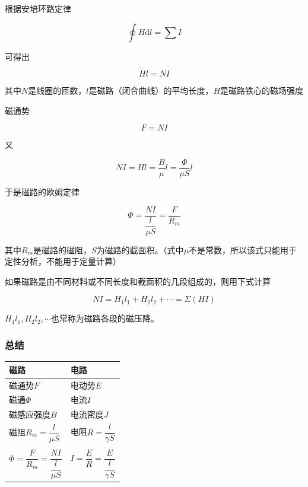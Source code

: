 \documentclass[12pt]{article}
\newcommand{\rmd}{\mathrm{d}}
\begin{document}
根据安培环路定律

\begin{equation}
    \oint H \rmd l = \sum I
\end{equation}

可得出

\begin{equation}
    H l = N I
\end{equation}

其中\(N\)是线圈的匝数，\(l\)是磁路（闭合曲线）的平均长度，\(H\)是磁路铁心的磁场强度

磁通势

\begin{equation}
    F = NI
\end{equation}

又

\begin{equation}
    NI = Hl = \frac{B}{\mu}l = \frac{\Phi}{\mu S}l
\end{equation}

于是磁路的欧姆定律

\begin{equation}
    \Phi = \frac{NI}{\dfrac{l}{\mu S}} = \frac{F}{R_m}
\end{equation}

其中\(R_m\)是磁路的磁阻，\(S\)为磁路的截面积。（式中\(\mu\)不是常数，所以该式只能用于定性分析，不能用于定量计算）

如果磁路是由不同材料或不同长度和截面积的几段组成的，则用下式计算

\begin{equation}
    NI = H_1l_1 + H_2l_2 + \cdots = \Sigma (HI)
\end{equation}

\(H_1l_1, H_2l_2, \cdots\)也常称为磁路各段的磁压降。

\subsubsection{总结}

\begin{center}
\begin{tabular}{l|l}
  磁路 & 电路  \\
  \midrule
  磁通势\(F\) & 电动势\(E\) \\
  磁通\(\Phi\)  & 电流\(I\)  \\
  磁感应强度\(B\) & 电流密度\(J\) \\
  磁阻\(R_m = \dfrac{l}{\mu S}\) & 电阻\(R = \dfrac{l}{\gamma S}\) \\
  \\
  \(\Phi = \dfrac{F}{R_m} = \dfrac{NI}{\dfrac{l}{\mu S}}\)& \(I = \dfrac{E}{R} = \dfrac{E}{\dfrac{l}{\gamma S}}\) \\
\end{tabular}
\end{center}
\end{document}
